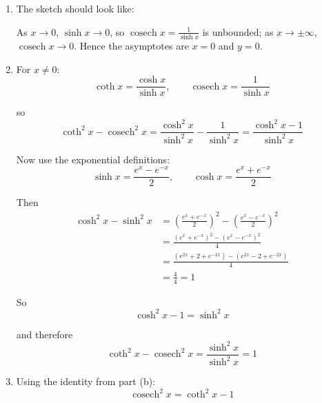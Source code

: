 \documentclass[leqno]{article}
\begin{document}
\begin{enumerate}[
  label=\textbf{\arabic*.},
  leftmargin=*,
  topsep=0pt,
  partopsep=0pt,
  parsep=0pt
]
\vspace*{10pt}

\begin{djsSolution}
\begin{enumerate}[label=\textbf{(\alph*)}]
  \item The sketch should look like:\par\nopagebreak

  
  
  As \(x\to 0\), \(\sinh x\to 0\), so \(\operatorname{cosech} x=\frac{1}{\sinh x}\) is unbounded; as \(x\to\pm\infty\), \(\operatorname{cosech} x\to 0\). Hence the asymptotes are \(x=0\) and \(y=0\).

  \item For \(x\ne 0\):
  \[
  \coth x=\frac{\cosh x}{\sinh x},
  \qquad
  \operatorname{cosech} x=\frac{1}{\sinh x}
  \]

  so
  \[
  \coth^2 x-\operatorname{cosech}^2 x
  =\frac{\cosh^2 x}{\sinh^2 x}-\frac{1}{\sinh^2 x}
  =\frac{\cosh^2 x-1}{\sinh^2 x}
  \]

  Now use the exponential definitions:
  \[
  \sinh x=\frac{e^x-e^{-x}}{2},
  \qquad
  \cosh x=\frac{e^x+e^{-x}}{2}
  \]

  Then
  \begin{align*}
  \cosh^2 x-\sinh^2 x
  &=\left(\frac{e^x+e^{-x}}{2}\right)^2-\left(\frac{e^x-e^{-x}}{2}\right)^2 \\
  &=\frac{(e^x+e^{-x})^2-(e^x-e^{-x})^2}{4} \\
  &=\frac{(e^{2x}+2+e^{-2x})-(e^{2x}-2+e^{-2x})}{4} \\
  &=\frac{4}{4}=1
  \end{align*}

  So
  \[
  \cosh^2 x-1=\sinh^2 x
  \]

  and therefore
  \[
  \coth^2 x-\operatorname{cosech}^2 x
  =\frac{\sinh^2 x}{\sinh^2 x}=1
  \]

  \item Using the identity from part (b):
  \[
  \operatorname{cosech}^2 x=\coth^2 x-1
  \]


\end{enumerate}
\end{djsSolution}
\end{enumerate}
\end{document}
